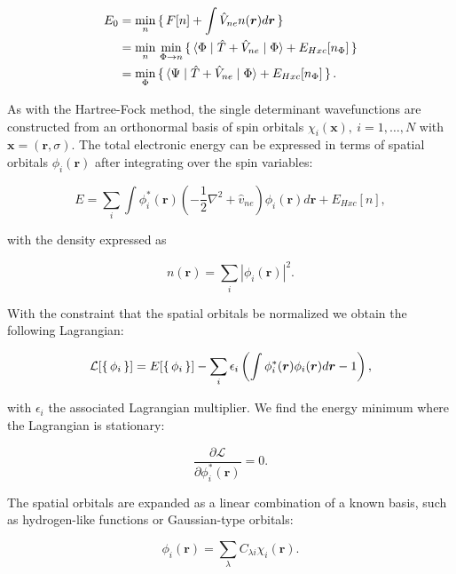 \begin{equation}
    \begin{split}
        E_0
        &= \underset{n}{\min} \set{
            F[n] + \int \hat{V}_{ne} n(\bm{r}) d\bm{r} } \\
        &= \underset{n}{\min} \
            \underset{\Phi \rightarrow n}{\min} \set{
            \braket{\Phi | \hat{T} + \hat{V}_{ne} | \Phi}
            + E_{Hxc}[n_{\Phi}]} \\
        &=  \underset{\Phi}{\min}
            \set{ \braket{\Psi|\hat{T} + \hat{V}_{ne}|\Phi}
            + E_{Hxc}[n_{\Phi}]} .
    \end{split}
\end{equation}

As with the Hartree-Fock method, the single determinant
wavefunctions are constructed from an orthonormal basis of spin orbitals
$\chi_i (\bm{x}), \ i=1,\dots,N$ with $\bm{x} = (\bm{r}, \sigma)$.
The total electronic energy can be expressed in terms of spatial
orbitals $\phi_i(\bm{r})$ after integrating over the spin variables:

\begin{equation}
    E = \sum_i \int \phi_i^* (\bm{r}) (-\frac{1}{2} \nabla^2 + \hat{v}_{ne})
        \phi_i(\bm{r}) d\bm{r} + E_{Hxc}[n] ,
\end{equation}

with the density expressed as

\begin{equation}
    n(\bm{r}) = \sum_i \left| \phi_i(\bm{r}) \right|^2 .
\end{equation}

With the constraint that the spatial orbitals be normalized
we obtain the following Lagrangian:

$$ \mathcal{L} [\set{\phi_i}]
    = E[\set{\phi_i}] - \sum_i \epsilon_i
    \left( \int \phi_i^* (\bm{r}) \phi_i(\bm{r}) d\bm{r} - 1 \right) , $$

with $\epsilon_i$ the associated Lagrangian multiplier.
We find the energy minimum where the Lagrangian is stationary:

$$ \frac{\partial \mathcal{L}}{\partial \phi_i^* (\bm{r})} = 0 . $$

The spatial orbitals are expanded as a linear combination
of a known basis, such as hydrogen-like functions
or Gaussian-type orbitals:

$$ \phi_i(\bm{r}) = \sum_{\lambda} C_{\lambda i} \chi_i (\bm{r}) . $$
